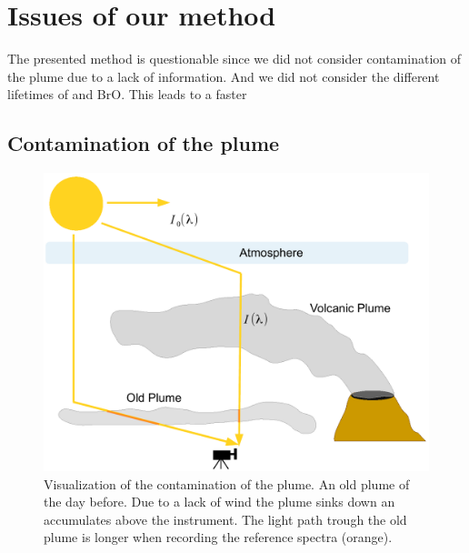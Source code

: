 \documentclass  [
  paper    = a4,
  BCOR     = 10mm,
  twoside,
  fontsize = 12pt,
  fleqn,
  toc      = bibnumbered,
  toc      = listofnumbered,
  numbers  = noendperiod,
  headings = normal,
  listof   = leveldown,
  version  = 3.03
]                                       {scrreprt}
\begin{document}
	\chapter{Issues of our method}
	The presented method is questionable since we did not consider contamination of the plume due to a lack of information. And we did not consider the different lifetimes of  and BrO. This leads to a faster 
	
	\section{Contamination of the plume}
	\begin{figure}
		\centering
		\includegraphics[width=0.7\linewidth]{Bilder/Contaminationplume}
		\caption{Visualization of the contamination of the plume. An old plume of the day before. Due to a lack of wind the plume sinks down an accumulates above the instrument. The light path trough the old plume is longer when recording the reference spectra (orange).}
		\label{fig:contaminationplume}
	\end{figure}
\end{document}

